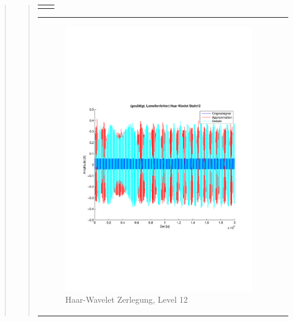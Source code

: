 \begin{quote}
\begin{quote}
\begin{center}
\begin{tabular}{ll}
\begin{minipage}{0.6\textwidth}
                    \end{minipage}
    
                \end{tabular}
                \end{center}
    
                
                
                    \begin{center}
                \begin{tabular}{ll}
    
                \hspace{-8em}
                    \begin{minipage}{0.6\textwidth}
    
                        \begin{figure}[H]
                            \label{fig:}
                            \includegraphics[scale=0.4, trim = 2cm 6cm 1cm
                            7.5cm,
                            clip]{./Bilder/Termin8/lamellenfehler_gesaettigt_Haar_Wavlet_lvl_12}
                            \caption{Haar-Wavelet Zerlegung, Level 12}
                        \end{figure}
    

\end{minipage}
\end{tabular}
\end{center}
\end{quote}
\end{quote}
